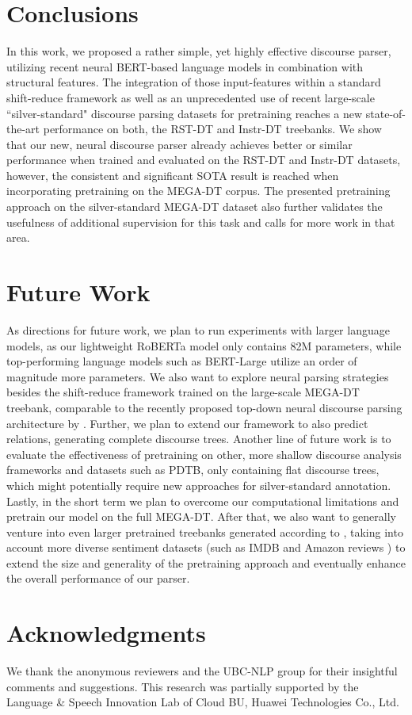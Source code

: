 \documentclass[11pt]{article}
\begin{document}
\section{Conclusions} 
In this work, we proposed a rather simple, yet highly effective discourse parser, utilizing recent neural BERT-based language models in combination with structural features. The integration of those input-features within a standard shift-reduce framework as well as an unprecedented use of recent large-scale ``silver-standard" discourse parsing datasets for pretraining reaches a new state-of-the-art performance on both, the RST-DT and Instr-DT treebanks. We show that our new, neural discourse parser already achieves better or similar performance when trained and evaluated on the RST-DT and Instr-DT datasets, however, the consistent and significant SOTA result is reached when incorporating pretraining on the MEGA-DT corpus. The presented pretraining approach on the silver-standard MEGA-DT dataset also further validates the usefulness of additional supervision for this task and calls for more work in that area. 

\section{Future Work}

As directions for future work, we plan to run experiments with larger language models, as our lightweight RoBERTa model only contains 82M parameters, while top-performing language models such as BERT-Large utilize an order of magnitude more parameters. We also want to explore neural parsing strategies besides the shift-reduce framework trained on the large-scale MEGA-DT treebank, comparable to the recently proposed top-down neural discourse parsing architecture by . Further, we plan to extend our framework to also predict relations, generating complete discourse trees. Another line of future work is to evaluate the effectiveness of pretraining on other, more shallow discourse analysis frameworks and datasets such as PDTB, only containing flat discourse trees, which might potentially require new approaches for silver-standard annotation. Lastly, in the short term we plan to overcome our computational limitations and pretrain our model on the full MEGA-DT. After that, we also want to generally venture into even larger pretrained treebanks generated according to , taking into account more diverse sentiment datasets (such as IMDB \cite{diao2014jointly} and Amazon reviews \cite{zhang2015character}) to extend the size and generality of the pretraining approach and eventually enhance the overall performance of our parser.

\section*{Acknowledgments}
We thank the anonymous reviewers and the UBC-NLP group for their insightful comments and suggestions. 
This research was partially supported by the Language \& Speech Innovation Lab of Cloud BU, Huawei Technologies Co., Ltd.




\end{document}
